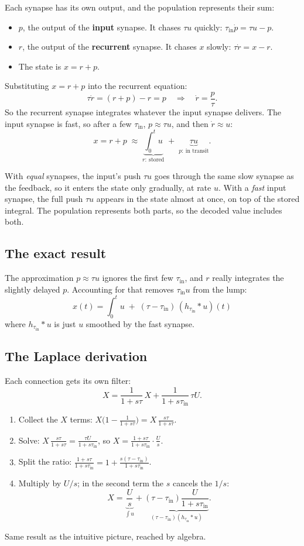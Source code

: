 \documentclass[11pt,letterpaper]{article}
\newcommand{\tin}{\tau_{\mathrm{in}}}
\begin{document}
Each synapse has its own output, and the population represents their sum:
\begin{itemize}
\item $p$, the output of the \textbf{input} synapse. It chases $\tau u$ quickly: $\tin\dot p = \tau u - p$.
\item $r$, the output of the \textbf{recurrent} synapse. It chases $x$ slowly: $\tau\dot r = x - r$.
\item The state is $x = r + p$.
\end{itemize}
Substituting $x = r + p$ into the recurrent equation:
\[
\tau\dot r = (r + p) - r = p \quad\Longrightarrow\quad \dot r = \frac{p}{\tau}.
\]
So the recurrent synapse integrates whatever the input synapse delivers. The input synapse is fast, so after a few $\tin$, $p \approx \tau u$, and then $\dot r \approx u$:
\[
x = r + p \;\approx\; \underbrace{\int_0^t u}_{r:\ \text{stored}} \;+\; \underbrace{\tau u}_{p:\ \text{in transit}} .
\]

\begin{howto}
With \emph{equal} synapses, the input's push $\tau u$ goes through the same slow synapse as the feedback, so it enters the state only gradually, at rate $u$. With a \emph{fast} input synapse, the full push $\tau u$ appears in the state almost at once, on top of the stored integral. The population represents both parts, so the decoded value includes both.
\end{howto}

\subsection*{The exact result}

The approximation $p \approx \tau u$ ignores the first few $\tin$, and $r$ really integrates the slightly delayed $p$. Accounting for that removes $\tin u$ from the lump:
\[
\boxed{\ x(t) = \int_0^t u \;+\; (\tau - \tin)\,(h_{\tin} * u)(t)\ }
\]
where $h_{\tin} * u$ is just $u$ smoothed by the fast synapse.

\subsection*{The Laplace derivation}

Each connection gets its own filter:
\[
X = \frac{1}{1 + s\tau}\,X + \frac{1}{1 + s\tin}\,\tau U .
\]
\begin{enumerate}
\item Collect the $X$ terms: $X\bigl(1 - \frac{1}{1 + s\tau}\bigr) = X\,\frac{s\tau}{1 + s\tau}$.
\item Solve: $X\,\frac{s\tau}{1 + s\tau} = \frac{\tau U}{1 + s\tin}$, so $X = \frac{1 + s\tau}{1 + s\tin}\cdot\frac{U}{s}$.
\item Split the ratio: $\frac{1 + s\tau}{1 + s\tin} = 1 + \frac{s(\tau - \tin)}{1 + s\tin}$.
\item Multiply by $U/s$; in the second term the $s$ cancels the $1/s$:
\[
X = \underbrace{\frac{U}{s}}_{\int u} + \underbrace{(\tau - \tin)\frac{U}{1 + s\tin}}_{(\tau - \tin)(h_{\tin} * u)} .
\]
\end{enumerate}
Same result as the intuitive picture, reached by algebra.
\end{document}
